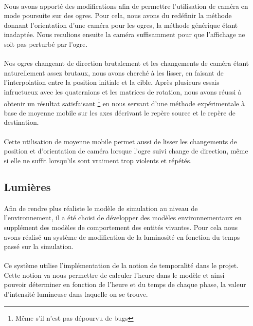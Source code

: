 \paragraph{}
Nous avons apporté des modifications afin de permettre l'utilisation de caméra
en mode poursuite sur des ogres. Pour cela, nous avons du redéfinir la méthode
donnant l'orientation d'une caméra pour les ogres, la méthode générique étant
inadaptée. Nous reculions ensuite la caméra suffisamment pour que l'affichage ne
soit pas perturbé par l'ogre.

\paragraph{}
Nos ogres changeant de direction brutalement et les changements de caméra étant
naturellement assez brutaux, nous avons cherché à les lisser, en faisant de
l'interpolation entre la position initiale et la cible. Après plusieurs essais
infructueux avec les quaternions et les matrices de rotation, nous avons réussi
à obtenir un résultat satisfaisant \footnote{Même s'il n'est pas dépourvu de
bugs} en nous servant d'une méthode expérimentale à base de moyenne mobile sur
les axes décrivant le repère source et le repère de destination.

\paragraph{}
Cette utilisation de moyenne mobile permet aussi de lisser les changements de
position et d'orientation de caméra lorsque l'ogre suivi change de direction,
même si elle ne suffit lorsqu'ils sont vraiment trop violents et répétés.

\subsection{Lumières}
\paragraph{}
Afin de rendre plus réaliste le modèle de simulation au niveau de
l'environnement, il a été choisi de développer des modèles environnementaux en
supplément des modèles de comportement des entités vivantes. Pour cela nous
avons réalisé un système de modification de la luminosité en fonction du temps
passé sur la simulation.

\paragraph{}
Ce système utilise l'implémentation de la notion de temporalité dans le projet.
Cette notion va nous permettre de calculer l'heure dans le modèle et ainsi
pouvoir déterminer en fonction de l'heure et du temps de chaque phase, la valeur
d'intensité lumineuse dans laquelle on se trouve.

